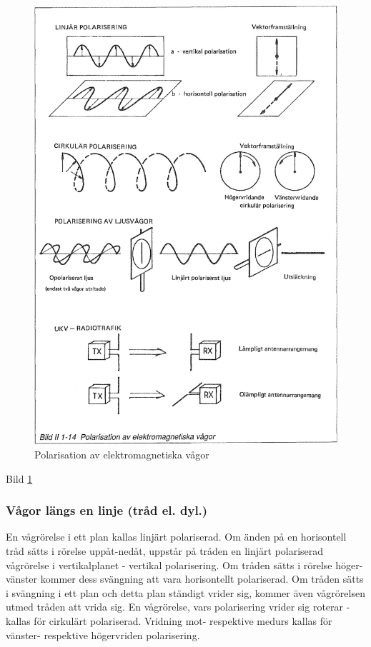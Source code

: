 \begin{figure}
  \includegraphics[width=\textwidth]{images/bild_2_1-14}
  \caption{Polarisation av elektromagnetiska vågor}
  \label{fig:BildII1-14}
\end{figure}

Bild \ref{fig:BildII1-14}

\subsubsection{Vågor längs en linje (tråd el. dyl.)}
En vågrörelse i ett plan kallas linjärt polariserad. Om änden på en horisontell
tråd sätts i rörelse uppåt-nedåt, uppstår på tråden en linjärt polariserad
vågrörelse i vertikalplanet - vertikal polarisering.
Om tråden sätts i rörelse höger-vänster kommer dess svängning att vara
horisontellt polariserad.
Om tråden sätts i svängning i ett plan och detta plan ständigt vrider sig,
kommer även vågrörelsen utmed tråden att vrida sig. En vågrörelse, vars
polarisering vrider sig roterar - kallas för cirkulärt polariserad. Vridning
mot- respektive medurs kallas för vänster- respektive högervriden polarisering.

